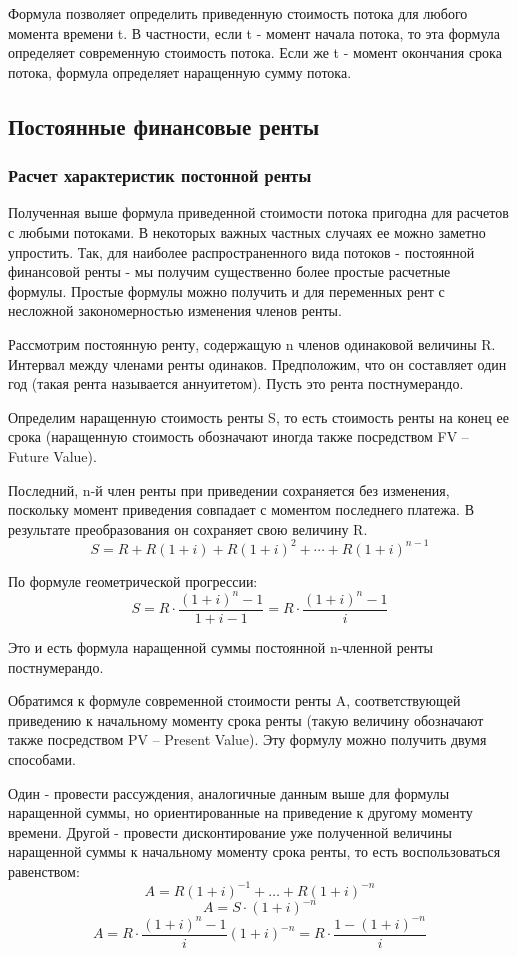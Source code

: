 \documentclass[aps,%
12pt,%
final,%
oneside,
onecolumn,%
musixtex, %
superscriptaddress,%
centertags]{article} %
\begin{document}
Формула позволяет определить приведенную стоимость потока для любого момента времени t. В частности, если t - момент начала потока, то эта формула определяет современную стоимость потока. Если же t - момент окончания срока потока, формула определяет наращенную сумму потока.

\subsection{Постоянные финансовые ренты}
\subsubsection{Расчет характеристик постонной ренты}

Полученная выше формула приведенной стоимости потока пригодна для расчетов с любыми потоками. В некоторых важных частных случаях ее можно заметно упростить. Так, для наиболее распространенного вида потоков - постоянной финансовой ренты - мы получим существенно более простые расчетные формулы. Простые формулы можно получить и для переменных рент с несложной закономерностью изменения членов ренты.

Рассмотрим постоянную ренту, содержащую n членов одинаковой величины R. Интервал между членами ренты одинаков. Предположим, что он составляет один год (такая рента называется аннуитетом). Пусть это рента постнумерандо.

Определим наращенную стоимость ренты S, то есть стоимость ренты на конец ее срока (наращенную стоимость обозначают иногда также посредством FV – Future Value).

Последний, n-й член ренты при приведении сохраняется без изменения, поскольку момент приведения совпадает с моментом последнего платежа. В результате преобразования он сохраняет свою величину R.
$$ S = R + R(1+i) + R(1+i)^2 + \cdots + R(1+i)^{n-1}$$

По формуле геометрической прогрессии:
$$ S = R \cdot \frac{(1+i)^n - 1 }{1+i-1} = R \cdot \frac{(1+i)^n - 1 }{i} $$

Это и есть формула наращенной суммы постоянной n-членной ренты постнумерандо. 

Обратимся к формуле современной стоимости ренты A, соответствующей приведению к начальному моменту срока ренты (такую величину обозначают также посредством PV – Present Value). Эту формулу можно получить двумя способами.

Один - провести рассуждения, аналогичные данным выше для формулы наращенной суммы, но ориентированные на приведение к другому моменту времени. Другой - провести дисконтирование уже полученной величины наращенной суммы к начальному моменту срока ренты, то есть воспользоваться равенством:
$$ A = R (1+i)^{-1} + \ldots + R (1+i)^{-n}$$ 
$$ A  = S\cdot (1+i)^{-n}$$
$$ A = R \cdot \frac{(1+i)^n - 1 }{i} (1+i)^{-n} = R \cdot \frac {1-(1+i)^{-n}}{i}$$
\end{document}
